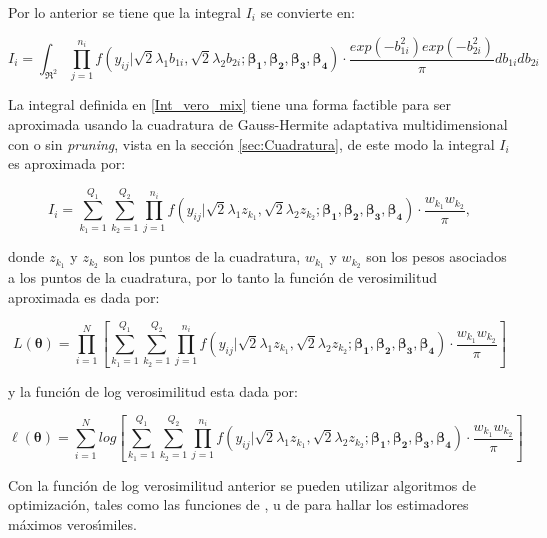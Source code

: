 Por lo anterior se tiene que la integral $I_i$ se convierte en:

\begin{equation}
I_i=\int_{\Re^2}{\prod_{j=1}^{n_i}f(y_{ij}|\sqrt{2}\lambda_1b_{1i},\sqrt{2}\lambda_2 b_{2i};\boldsymbol{\beta_1}, \boldsymbol{\beta_2}, \boldsymbol{\beta_3}, \boldsymbol{\beta_4})\cdot \frac{exp(-b_{1i}^2) exp(-b_{2i}^2)}{\pi} db_{1i}db_{2i}}
\label{Int_vero_mix}
\end{equation}

La integral definida en \eqref{Int_vero_mix} tiene una forma factible para ser aproximada usando la cuadratura de Gauss-Hermite adaptativa multidimensional con o sin \textit{pruning}, vista en la secci\'{o}n \ref{sec:Cuadratura}, de este modo la integral $I_i$ es aproximada por:

\[
I_i=\sum_{k_1=1}^{Q_1}{\sum_{k_2=1}^{Q_2}{\prod_{j=1}^{n_i}f(y_{ij}|\sqrt{2}\lambda_1 z_{k_1},\sqrt{2}\lambda_2 z_{k_2};\boldsymbol{\beta_1}, \boldsymbol{\beta_2}, \boldsymbol{\beta_3}, \boldsymbol{\beta_4})\cdot \frac{w_{k_1}w_{k_2}}{\pi}}},
\]

donde $z_{k_1}$ y $z_{k_2}$ son los puntos de la cuadratura, $w_{k_1}$ y $w_{k_2}$ son los pesos asociados a los puntos de la cuadratura, por lo tanto la funci\'{o}n de verosimilitud aproximada es dada por:

\[
L(\boldsymbol{\theta})=\prod_{i=1}^{N}{\left[\sum_{k_1=1}^{Q_1}{\sum_{k_2=1}^{Q_2}{\prod_{j=1}^{n_i}f(y_{ij}|\sqrt{2}\lambda_1 z_{k_1},\sqrt{2}\lambda_2 z_{k_2};\boldsymbol{\beta_1}, \boldsymbol{\beta_2}, \boldsymbol{\beta_3}, \boldsymbol{\beta_4})\cdot \frac{w_{k_1}w_{k_2}}{\pi}}}\right]}
\]

y la funci\'{o}n de log verosimilitud esta dada por:

\begin{equation}
\ell(\boldsymbol{\theta})=\sum_{i=1}^{N}log{\left[\sum_{k_1=1}^{Q_1}{\sum_{k_2=1}^{Q_2}{\prod_{j=1}^{n_i}f(y_{ij}|\sqrt{2}\lambda_1 z_{k_1},\sqrt{2}\lambda_2 z_{k_2};\boldsymbol{\beta_1}, \boldsymbol{\beta_2}, \boldsymbol{\beta_3}, \boldsymbol{\beta_4})\cdot \frac{w_{k_1}w_{k_2}}{\pi}}}\right]}
\label{LOG_vero_mix}
\end{equation}

Con la funci\'{o}n de log verosimilitud anterior se pueden utilizar algoritmos de optimizaci\'{o}n, tales como las funciones de ,  u  de  para hallar los estimadores m\'{a}ximos veros\'{\i}miles.\\

